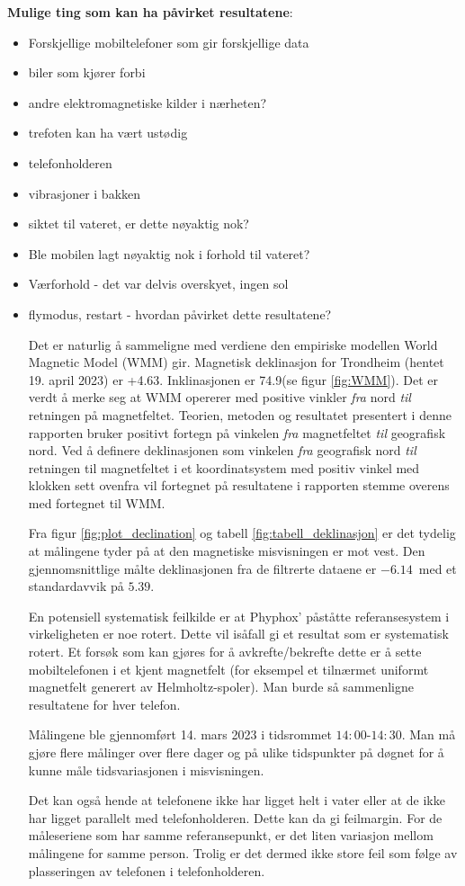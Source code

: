 \noindent\textbf{Mulige ting som kan ha påvirket resultatene}:
\begin{itemize}
    \item Forskjellige mobiltelefoner som gir forskjellige data 
    \item biler som kjører forbi
    \item andre elektromagnetiske kilder i nærheten? 
    \item trefoten kan ha vært ustødig
    \item telefonholderen
    \item vibrasjoner i bakken               
    \item siktet til vateret, er dette nøyaktig nok?
    \item Ble mobilen lagt nøyaktig nok i forhold til vateret?
    \item Værforhold - det var delvis overskyet, ingen sol
    \item flymodus, restart - hvordan påvirket dette resultatene?

Det er naturlig å sammeligne med verdiene den empiriske modellen World Magnetic Model (WMM) gir.
Magnetisk deklinasjon for Trondheim (hentet 19. april 2023) er +4.63\textdegree. Inklinasjonen er 74.9\textdegree (se figur \ref{fig:WMM}). 
\newline
Det er verdt å merke seg at WMM opererer med positive vinkler \textit{fra} nord \textit{til} retningen på magnetfeltet. 
Teorien, metoden og resultatet presentert i denne rapporten bruker positivt fortegn på vinkelen \textit{fra} magnetfeltet \textit{til} geografisk nord.
Ved å definere deklinasjonen som vinkelen \textit{fra} geografisk nord \textit{til} retningen til magnetfeltet i et koordinatsystem med positiv vinkel med klokken sett ovenfra vil fortegnet på resultatene i rapporten stemme overens med fortegnet til WMM.  
\par
Fra figur \ref{fig:plot_declination} og tabell \ref{fig:tabell_deklinasjon} er det tydelig at målingene tyder på at den magnetiske misvisningen er mot vest. Den gjennomsnittlige målte deklinasjonen fra de filtrerte dataene er $-6.14$\textdegree\ med et standardavvik på $5.39$\textdegree.
\par
En potensiell systematisk feilkilde er at Phyphox' påståtte referansesystem i virkeligheten er noe rotert. Dette vil isåfall gi et resultat som er systematisk rotert. 
Et forsøk som kan gjøres for å avkrefte/bekrefte dette er å sette mobiltelefonen i et kjent magnetfelt (for eksempel et tilnærmet uniformt magnetfelt generert av Helmholtz-spoler).
Man burde så sammenligne resultatene for hver telefon.
\par
Målingene ble gjennomført 14. mars 2023 i tidsrommet $14:00$-$14:30$.
Man må gjøre flere målinger over flere dager og på ulike tidspunkter på døgnet for å kunne måle tidsvariasjonen i misvisningen. 
\par
Det kan også hende at telefonene ikke har ligget helt i vater eller at de ikke har ligget parallelt med telefonholderen. Dette kan da gi feilmargin. For de måleseriene som har samme referansepunkt, er det liten variasjon mellom målingene for samme person. Trolig er det dermed ikke store feil som følge av plasseringen av telefonen i telefonholderen. 


\end{itemize}
